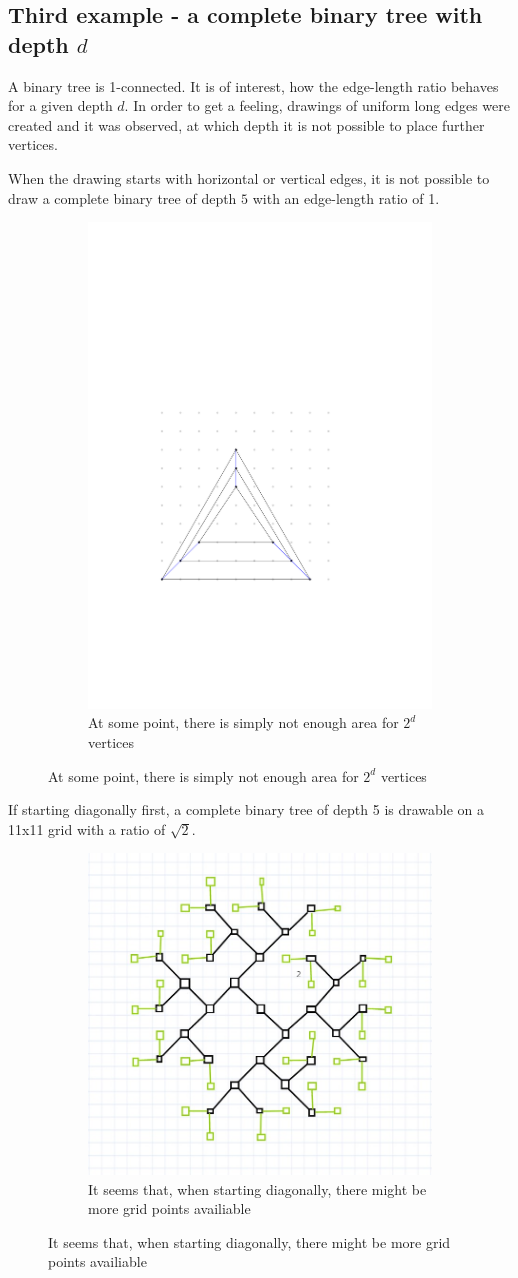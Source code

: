\subsection{Third example - a complete binary tree with depth $d$}
A binary tree is 1-connected. It is of interest, how the edge-length ratio behaves for a given depth $d$. In order to get a feeling, drawings of uniform long edges were created and it was observed, at which depth it is not possible to place further vertices.
\begin{observation}
	When the drawing starts with horizontal or vertical edges, it is not possible to draw a complete binary tree of depth $5$ with an edge-length ratio of 1.
\end{observation}
	\begin{figure}[H]
		\centering
		\begin{subfigure}{0.8\textwidth}
			\centering
			\includegraphics[width=0.5\linewidth,page=9]{drawings/Erste-Beispiele.pdf}
			\caption*{At some point, there is simply not enough area for $2^d$ vertices}
		\end{subfigure}
	\end{figure}
\begin{observation}
	If starting diagonally first, a complete binary tree of depth 5 is drawable on a 11x11 grid with a ratio of $\sqrt{2}$.
\end{observation}
	\begin{figure}[H]
	\centering
	\begin{subfigure}{0.8\textwidth}
		\centering
		\includegraphics[width=0.5\linewidth,page=9]{drawings/bintree-without-bends.jpg}
		\caption*{It seems that, when starting diagonally, there might be more grid points availiable}
	\end{subfigure}
\end{figure}
